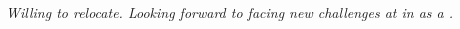 %
%
%
%
%



\newcommand\hSpaceLen{4pt}
\newcommand\vSpaceLen{6pt}

\begin{paracol}{2}[]
    \textbf{\huge{\bioName}}
    \switchcolumn
    \bioHeader
\end{paracol}

\vspace{\vSpaceLen}

\begin{center}
     \bioEmailUrl{} \hspace{\hSpaceLen}  \bioPhoneUrl{} \hspace{\hSpaceLen}  \bioHomepageUrl{}
    \\  \bioOrcidUrl{} \hspace{\hSpaceLen}  \bioResearchGateUrl{} \hspace{\hSpaceLen}  \bioLinkedInUrl{} \hspace{\hSpaceLen}  \bioGitHubUrl{} \\

    \vspace{\vSpaceLen}

    \begin{justify}
    \textit{\bioSummary{} Willing to relocate. Looking forward to facing new challenges at \positionCompany{} in \positionLocation{} as a \positionName{}.}
    \end{justify}
\end{center}



    